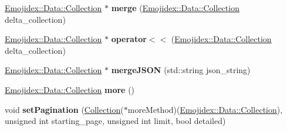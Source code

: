 \begin{DoxyCompactItemize}
\item 
\hyperlink{classEmojidex_1_1Data_1_1Collection}{Emojidex\+::\+Data\+::\+Collection} $\ast$ {\bfseries merge} (\hyperlink{classEmojidex_1_1Data_1_1Collection}{Emojidex\+::\+Data\+::\+Collection} delta\+\_\+collection)\hypertarget{classEmojidex_1_1Data_1_1Collection_a8166fb4585d12aa2843e7625a4accff2}{}\label{classEmojidex_1_1Data_1_1Collection_a8166fb4585d12aa2843e7625a4accff2}

\item 
\hyperlink{classEmojidex_1_1Data_1_1Collection}{Emojidex\+::\+Data\+::\+Collection} $\ast$ {\bfseries operator$<$$<$} (\hyperlink{classEmojidex_1_1Data_1_1Collection}{Emojidex\+::\+Data\+::\+Collection} delta\+\_\+collection)\hypertarget{classEmojidex_1_1Data_1_1Collection_abe7026c359c5cd222d61d34f38b1ce5d}{}\label{classEmojidex_1_1Data_1_1Collection_abe7026c359c5cd222d61d34f38b1ce5d}

\item 
\hyperlink{classEmojidex_1_1Data_1_1Collection}{Emojidex\+::\+Data\+::\+Collection} $\ast$ {\bfseries merge\+J\+S\+ON} (std\+::string json\+\_\+string)\hypertarget{classEmojidex_1_1Data_1_1Collection_abc94265d1af0e39ab7b12bbae92d4e4b}{}\label{classEmojidex_1_1Data_1_1Collection_abc94265d1af0e39ab7b12bbae92d4e4b}

\item 
\hyperlink{classEmojidex_1_1Data_1_1Collection}{Emojidex\+::\+Data\+::\+Collection} {\bfseries more} ()\hypertarget{classEmojidex_1_1Data_1_1Collection_a98118ea678e6b838e05f8d41f7ef7416}{}\label{classEmojidex_1_1Data_1_1Collection_a98118ea678e6b838e05f8d41f7ef7416}

\item 
void {\bfseries set\+Pagination} (\hyperlink{classEmojidex_1_1Data_1_1Collection}{Collection}($\ast$more\+Method)(\hyperlink{classEmojidex_1_1Data_1_1Collection}{Emojidex\+::\+Data\+::\+Collection}), unsigned int starting\+\_\+page, unsigned int limit, bool detailed)\hypertarget{classEmojidex_1_1Data_1_1Collection_ad18c6580a9afb8c132d4c158337e1524}{}\label{classEmojidex_1_1Data_1_1Collection_ad18c6580a9afb8c132d4c158337e1524}

\end{DoxyCompactItemize}
